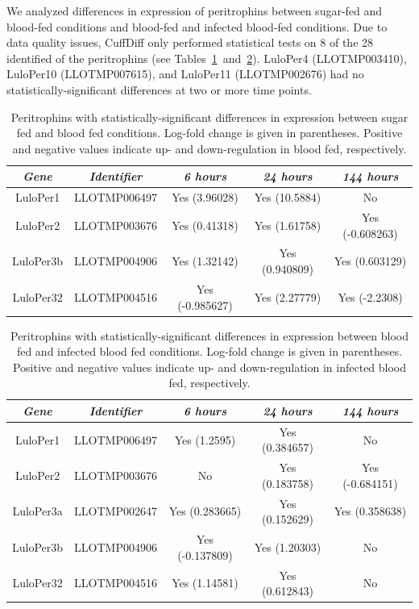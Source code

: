 We analyzed differences in expression of peritrophins between sugar-fed and blood-fed conditions and blood-fed and infected blood-fed conditions.  Due to data quality issues, CuffDiff only performed statistical tests on 8 of the 28 identified of the peritrophins (see Tables~\ref{tab:sandflies:stat-sig-peritrophins-sb}~and~\ref{tab:sandflies:stat-sig-peritrophins-bi}).  LuloPer4 (LLOTMP003410), LuloPer10 (LLOTMP007615), and LuloPer11 (LLOTMP002676) had no statistically-significant differences at two or more time points.

\begin{table}[H]
  \centering
  \begin{tabular}{ c c c c c } \hline
    \emph{Gene} & \emph{Identifier} & \emph{6 hours} & \emph{24 hours} & \emph{144 hours} \\ \hline
    LuloPer1 & LLOTMP006497 & Yes (3.96028) & Yes (10.5884) & No \\
    LuloPer2 & LLOTMP003676 & Yes (0.41318) & Yes (1.61758) & Yes (-0.608263) \\
    LuloPer3b & LLOTMP004906 & Yes (1.32142) & Yes (0.940809) & Yes (0.603129) \\
    LuloPer32 & LLOTMP004516 & Yes (-0.985627) & Yes (2.27779) & Yes (-2.2308)
  \end{tabular}
  \caption{Peritrophins with statistically-significant differences in expression between sugar fed and blood fed conditions. Log-fold change is given in parentheses. Positive and negative values indicate up- and down-regulation in blood fed, respectively.}
  \label{tab:sandflies:stat-sig-peritrophins-sb}
\end{table}

\begin{table}[H]
  \centering
  \begin{tabular}{ c c c c c } \hline
    \emph{Gene} & \emph{Identifier} & \emph{6 hours} & \emph{24 hours} & \emph{144 hours} \\ \hline
    LuloPer1 & LLOTMP006497 & Yes (1.2595) & Yes (0.384657) & No \\
    LuloPer2 & LLOTMP003676 & No & Yes (0.183758) & Yes (-0.684151) \\
    LuloPer3a & LLOTMP002647 & Yes (0.283665) & Yes (0.152629) & Yes (0.358638) \\
    LuloPer3b & LLOTMP004906 & Yes (-0.137809) & Yes (1.20303) & No \\
    LuloPer32 & LLOTMP004516 & Yes (1.14581) & Yes (0.612843) & No
  \end{tabular}
  \caption{Peritrophins with statistically-significant differences in expression between blood fed and infected blood fed conditions. Log-fold change is given in parentheses. Positive and negative values indicate up- and down-regulation in infected blood fed, respectively.}
  \label{tab:sandflies:stat-sig-peritrophins-bi}
\end{table}

